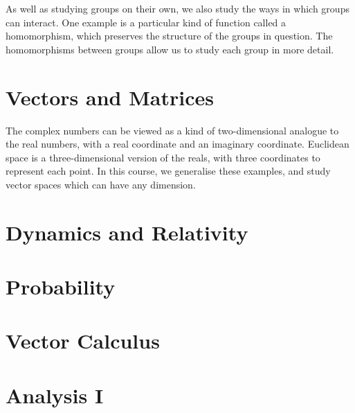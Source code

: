 As well as studying groups on their own, we also study the ways in which groups can interact.
One example is a particular kind of function called a homomorphism, which preserves the structure of the groups in question.
The homomorphisms between groups allow us to study each group in more detail.



\chapter{Vectors and Matrices}
The complex numbers can be viewed as a kind of two-dimensional analogue to the real numbers, with a real coordinate and an imaginary coordinate.
Euclidean space is a three-dimensional version of the reals, with three coordinates to represent each point.
In this course, we generalise these examples, and study vector spaces which can have any dimension.



\chapter{Dynamics and Relativity}

\chapter{Probability}

\chapter{Vector Calculus}

\chapter{Analysis I}



